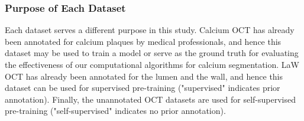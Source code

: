 \documentclass[a4paper,11pt,oneside]{report}
\begin{document}
\subsubsection{Purpose of Each Dataset}

Each dataset serves a different purpose in this study. Calcium OCT has already been annotated for calcium plaques by medical professionals, and hence this dataset may be used to train a model or serve as the ground truth for evaluating the effectiveness of our computational algorithms for calcium segmentation. LaW OCT has already been annotated for the lumen and the wall, and hence this dataset can be used for supervised pre-training ("supervised" indicates prior annotation). Finally, the unannotated OCT datasets are used for self-supervised pre-training ("self-supervised" indicates no prior annotation). 
\end{document}
